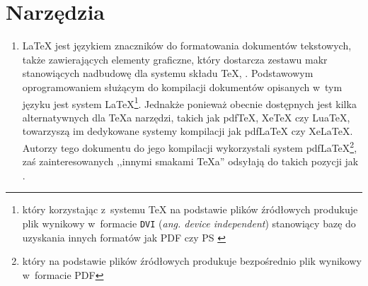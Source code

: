\section{Narzędzia}
\label{narzedzia}

\begin{enumerate}
\item \LaTeX{} jest językiem znaczników do formatowania dokumentów tekstowych, także zawierających elementy graficzne, który dostarcza zestawu makr stanowiących nadbudowę dla systemu składu \TeX, \cite{latex, latex_wiki, latex_wiki2}. Podstawowym oprogramowaniem służącym do kompilacji dokumentów opisanych w~tym języku jest system \LaTeX\footnote{który korzystając z~systemu \TeX{} na podstawie plików źródłowych produkuje plik wynikowy w~formacie \texttt{DVI} (\emph{ang. device independent}) stanowiący bazę do uzyskania innych formatów jak PDF czy PS \cite{dvi_wiki}}. Jednakże ponieważ obecnie dostępnych jest kilka alternatywnych dla \TeX{}a narzędzi, takich jak pdf\TeX, Xe\TeX{} czy Lua\TeX, towarzyszą im dedykowane systemy kompilacji jak pdf\LaTeX{} czy Xe\LaTeX. Autorzy tego dokumentu do jego kompilacji wykorzystali system pdf\LaTeX\footnote{który na podstawie plików źródłowych produkuje bezpośrednio plik wynikowy w~formacie PDF}, zaś zainteresowanych ,,innymi smakami \TeX{}a'' odsyłają do takich pozycji jak \cite{latex_kucharska,tex_legacy,xxxtex}.
  

\end{enumerate}
